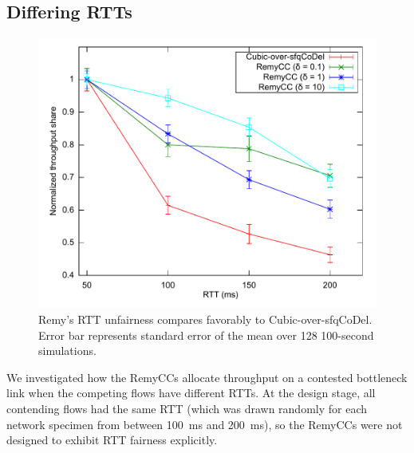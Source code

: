 %
%


%

\subsection{Differing RTTs}

\begin{figure}

\includegraphics[width=\columnwidth]{rttfairness.pdf}
\caption{Remy's RTT unfairness compares favorably to
  Cubic-over-sfqCoDel. Error bar represents standard error of the
  mean over 128 100-second simulations.}

\label{f:fairness}

\end{figure}

We investigated how the RemyCCs allocate throughput on a contested
bottleneck link when the competing flows have different RTTs. At the
design stage, all contending flows had the same RTT (which was drawn
randomly for each network specimen from between 100~ms and 200~ms), so
the RemyCCs were not designed to exhibit RTT fairness explicitly.

